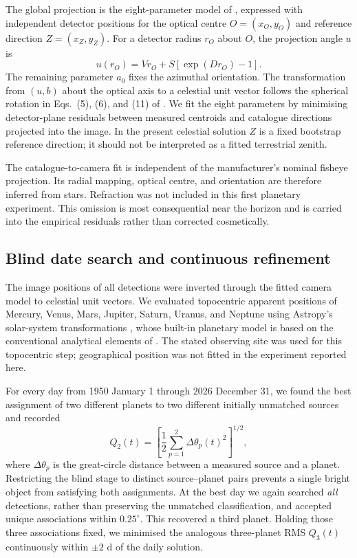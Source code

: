 \documentclass{aa}
\begin{document}
The global projection is the eight-parameter model of
\citet{Barghini2019}, expressed with independent detector positions for the
optical centre $O=(x_O,y_O)$ and reference direction $Z=(x_Z,y_Z)$. For a
detector radius $r_O$ about $O$, the projection angle $u$ is
\begin{equation}
  u(r_O)=V r_O+S\left[\exp(D r_O)-1\right].
  \label{eq:radial}
\end{equation}
The remaining parameter $a_0$ fixes the azimuthal orientation. The transformation
from $(u,b)$ about the optical axis to a celestial unit vector follows the
spherical rotation in Eqs.~(5), (6), and (11) of \citet{Barghini2019}. We fit
the eight parameters by minimising detector-plane residuals between measured
centroids and catalogue directions projected into the image. In the present
celestial solution $Z$ is a fixed bootstrap reference direction; it should not
be interpreted as a fitted terrestrial zenith.

The catalogue-to-camera fit is independent of the manufacturer's nominal
fisheye projection. Its radial mapping, optical centre, and orientation are
therefore inferred from stars. Refraction was not included in this first
planetary experiment. This omission is most consequential near the horizon and
is carried into the empirical residuals rather than corrected cosmetically.

\subsection{Blind date search and continuous refinement}

The image positions of all detections were inverted through the fitted camera
model to celestial unit vectors. We evaluated topocentric apparent positions
of Mercury, Venus, Mars, Jupiter, Saturn, Uranus, and Neptune using Astropy's
solar-system transformations \citep{Astropy2022}, whose built-in planetary
model is based on the conventional analytical elements of \citet{Simon1994}.
The stated observing site was used for this topocentric step; geographical
position was not fitted in the experiment reported here.

For every day from 1950 January 1 through 2026 December 31, we found the best
assignment of two different planets to two different initially unmatched
sources and recorded
\begin{equation}
  Q_2(t)=\left[\frac{1}{2}\sum_{p=1}^{2}
       \Delta\theta_p(t)^2\right]^{1/2},
  \label{eq:q2}
\end{equation}
where $\Delta\theta_p$ is the great-circle distance between a measured source
and a planet. Restricting the blind stage to distinct source--planet pairs
prevents a single bright object from satisfying both assignments. At the best
day we again searched \emph{all} detections, rather than preserving the
unmatched classification, and accepted unique associations within
$0.25^\circ$. This recovered a third planet. Holding those three associations
fixed, we minimised the analogous three-planet RMS $Q_3(t)$ continuously within
$\pm2$ d of the daily solution.
\end{document}
